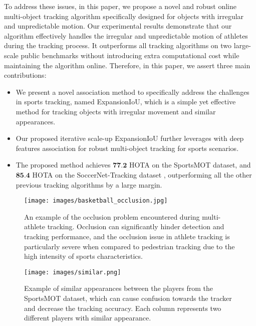 \documentclass[10pt,twocolumn,letterpaper]{article}
\begin{document}
To address these issues, in this paper, we propose a novel and robust online multi-object tracking algorithm specifically designed for objects with irregular and unpredictable motion. Our experimental results demonstrate that our algorithm effectively handles the irregular and unpredictable motion of athletes during the tracking process. It outperforms all tracking algorithms on two large-scale public benchmarks \cite{cui2023sportsmot} without introducing extra computational cost while maintaining the algorithm online. Therefore, in this paper, we assert three main contributions:

\begin{itemize}
\setlength{\itemsep}{0pt}
\setlength{\parsep}{0pt}
\setlength{\parskip}{0pt}
    \item We present a novel association method to specifically address the challenges in sports tracking, named ExpansionIoU, which is a simple yet effective method for tracking objects with irregular movement and similar appearances.
    \item Our proposed iterative scale-up ExpansionIoU further leverages with deep features association for robust multi-object tracking for sports scenarios. 
    \item The proposed method achieves $\textbf{77.2}$ HOTA on the SportsMOT \cite{cui2023sportsmot} dataset, and $\textbf{85.4}$ HOTA on the SoccerNet-Tracking dataset \cite{cioppa2022soccernet}, outperforming all the other previous tracking algorithms by a large margin.
\end{itemize}

\begin{figure}[t]
  \centering
  \texttt{[image: images/basketball\_occlusion.jpg]}
  \caption{An example of the occlusion problem encountered during multi-athlete tracking. Occlusion can significantly hinder detection and tracking performance, and the occlusion issue in athlete tracking is particularly severe when compared to pedestrian tracking due to the high intensity of sports characteristics.}
  \label{fig:occlusion}
\end{figure}

\begin{figure}[t]
  \centering
  \texttt{[image: images/similar.png]}
  \caption{Example of similar appearances between the players from the SportsMOT dataset, which can cause confusion towards the tracker and decrease the tracking accuracy. Each column represents two different players with similar appearance.}
  \label{fig:similar}
\end{figure}
\end{document}
